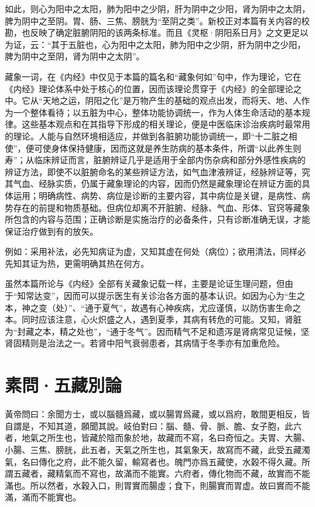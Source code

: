 \documentclass[12pt]{ctexbook}
\begin{document}
如此，则心为阳中之太阳，肺为阳中之少阴，肝为阴中之少阳，肾为阴中之太阴，脾为阴中之至阴。胃、肠、三焦、膀胱为“至阴之类”。新校正对本篇有关内容的校勘，也反映了确定脏腑阴阳的该两条标准。而且《灵枢·阴阳系日月》之文更足以为证，云：“其于五脏也，心为阳中之太阳，肺为阳中之少阴，肝为阴中之少阳，脾为阴中之至阴，肾为阴中之太阴”。



藏象一词，在《内经》中仅见于本篇的篇名和“藏象何如”句中，作为理论，它在《内经》理论体系中处于核心的位置，因而该理论贯穿于《内经》的全部理论之中。它从“天地之运，阴阳之化”是万物产生的基础的观点出发，而将天、地、人作为一个整体看待；以五脏为中心，整体功能协调统一，作为人体生命活动的基本规律。这些基本观点和在其指导下形成的相关理论，便是中医临床诊治疾病时最常用的理论。人能与自然环境相适应，并做到各脏腑功能协调统一，即“十二脏之相使”，便可使身体保持健康，因而这就是养生防病的基本条件，所谓“以此养生则寿”；从临床辨证而言，脏腑辨证几乎是适用于全部内伤杂病和部分外感性疾病的辨证方法，即使不以脏腑命名的某些辨证方法，如气血津液辨证，经脉辨证等，究其气血、经脉实质，仍属于藏象理论的内容，因而仍然是藏象理论在辨证方面的具体运用；明确病性、病势、病位是诊断的主要内容，其中病位是关键，是病性、病势存在的前提和物质基础。但病位却离不开脏腑、经脉、气血、形体、官窍等藏象所包含的内容与范围；正确诊断是实施治疗的必备条件，只有诊断准确无误，才能保证治疗做到有的放矢。

例如：采用补法，必先知病证为虚，又知其虚在何处（病位）；欲用清法，同样必先知其证为热，更需明确其热在何方。

虽然本篇所论与《内经》全部有关藏象记载一样，主要是论证生理问题，但由于“知常达变”，因而可以提示医生有关诊治各方面的基本认识。如因为心为“生之本，神之变（处）”、“通于夏气”，故遇有心神疾病，尤应谨慎，以防伤害生命之本。同时应该注意，心火炽盛之人，遇到夏季，其病有转危的可能。又知，肾脏为“封藏之本，精之处也”，“通于冬气”。因而精气不足和遗泻是肾病常见证候，坚肾固精则是治法之一。若肾中阳气衰弱患者，其病情于冬季亦有加重危险。

\section{素問·五藏別論}%


\begin{yuanwen}
黃帝問曰：余聞方士，或以腦髓爲藏，或以腸胃爲藏，或以爲府，敢間更相反，皆自謂是，不知其道，願聞其說。岐伯對曰：腦、髓、骨、脈、膽、女子胞，此六者，地氣之所生也，皆藏於陰而象於地，故藏而不寫，名曰奇恒之。夫胃、大腸、小腸、三焦、膀胱，此五者，天氣之所生也，其氣象天，故寫而不藏，此受五藏濁氣，名曰傳化之府，此不能久留，輸寫者也。魄門亦爲五藏使，水榖不得久藏。所謂五藏者，藏精氣而不寫也，故滿而不能實。六府者，傳化物而不藏，故實而不能滿也。所以然者，水穀入口，則胃實而腸虛；食下，則腸實而胃虚。故曰實而不能滿，滿而不能實也。
\end{yuanwen}
\end{document}
